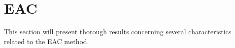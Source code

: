 \section{EAC}
\label{sec:eac results}

This section will present thorough results concerning several characteristics related to the EAC method.










%
%

% 
